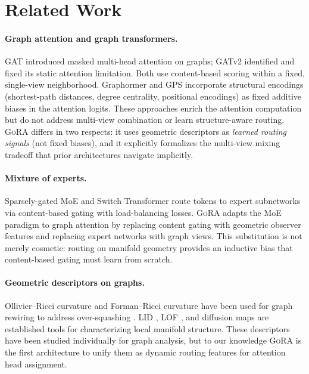 \documentclass[11pt,a4paper]{article}
\newcommand{\ours}{\textsc{GoRA}}  %
\begin{document}
\section{Related Work}
\label{sec:related}

\paragraph{Graph attention and graph transformers.}
GAT \citep{velickovic2018graph} introduced masked multi-head attention
on graphs; GATv2 \citep{brody2022how} identified and fixed its static
attention limitation.
Both use content-based scoring within a fixed, single-view neighborhood.
Graphormer \citep{ying2021transformers} and GPS
\citep{rampasek2022recipe} incorporate structural encodings
(shortest-path distances, degree centrality, positional encodings) as
fixed additive biases in the attention logits.
These approaches enrich the attention computation but do not address
multi-view combination or learn structure-aware routing.
\ours{} differs in two respects: it uses geometric descriptors as
\emph{learned routing signals} (not fixed biases), and it explicitly
formalizes the multi-view mixing tradeoff that prior architectures
navigate implicitly.

\paragraph{Mixture of experts.}
Sparsely-gated MoE \citep{shazeer2017outrageously} and Switch
Transformer \citep{fedus2022switch} route tokens to expert subnetworks
via content-based gating with load-balancing losses.
\ours{} adapts the MoE paradigm to graph attention by replacing content
gating with geometric observer features and replacing expert networks
with graph views.
This substitution is not merely cosmetic: routing on manifold geometry
provides an inductive bias that content-based gating must learn from
scratch.

\paragraph{Geometric descriptors on graphs.}
Ollivier--Ricci curvature \citep{ollivier2009ricci} and Forman--Ricci
curvature \citep{forman2003bochner} have been used for graph rewiring to
address over-squashing \citep{topping2022understanding}.
LID \citep{levina2004maximum}, LOF \citep{breunig2000lof}, and diffusion
maps \citep{coifman2006diffusion} are established tools for
characterizing local manifold structure.
These descriptors have been studied individually for graph analysis, but
to our knowledge \ours{} is the first architecture to unify them as
dynamic routing features for attention head assignment.
\end{document}
